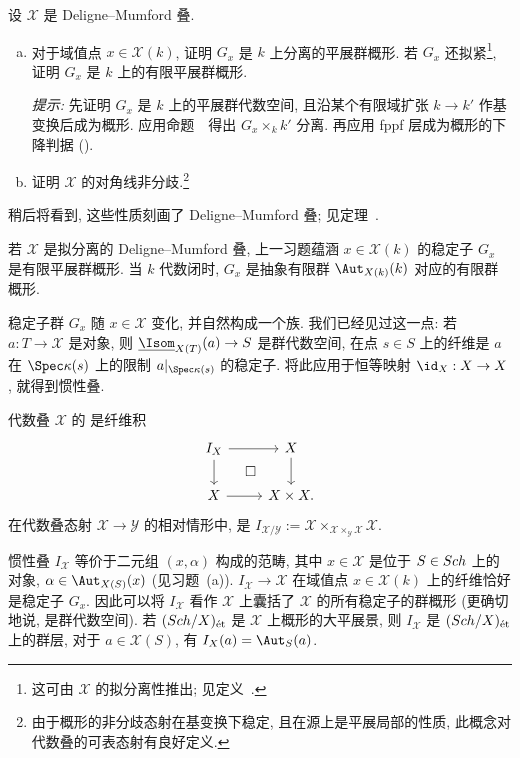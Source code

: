 \begin{exercise}\label{src:4.2.8}
设 $\mathcal X$ 是 Deligne--Mumford 叠.
\begin{enumerate}[(a)]
\item 对于域值点 $x\in\mathcal X(k)$, 证明 $G_x$ 是 $k$ 上分离的平展群概形. 若 $G_x$ 还拟紧\footnote{这可由 $\mathcal X$ 的拟分离性推出; 见定义~.}, 证明 $G_x$ 是 $k$ 上的有限平展群概形.

\emph{提示:} 先证明 $G_x$ 是 $k$ 上的平展群代数空间, 且沿某个有限域扩张 $k\to k'$ 作基变换后成为概形. 应用命题~~得出 $G_x\times_k k'$ 分离. 再应用 fppf 层成为概形的下降判据 ().
\item 证明 $\mathcal X$ 的对角线非分歧.\footnote{由于概形的非分歧态射在基变换下稳定, 且在源上是平展局部的性质, 此概念对代数叠的可表态射有良好定义.}
\end{enumerate}
稍后将看到, 这些性质刻画了 Deligne--Mumford 叠; 见定理~.
\end{exercise}
\begin{remark}\label{src:4.2.9}
若 $\mathcal X$ 是拟分离的 Deligne--Mumford 叠, 上一习题蕴涵 $x\in\mathcal X(k)$ 的稳定子 $G_x$ 是有限平展群概形. 当 $k$ 代数闭时, $G_x$ 是抽象有限群 $\Aut_{\mathcal X(k)}(k)$ 对应的有限群概形.
\end{remark}
稳定子群 $G_x$ 随 $x\in\mathcal X$ 变化, 并自然构成一个族. 我们已经见过这一点: 若 $a:T\to\mathcal X$ 是对象, 则 $\underline{\Isom}_{\mathcal X(T)}(a)\to S$ 是群代数空间, 在点 $s\in S$ 上的纤维是 $a$ 在 $\Spec\kappa(s)$ 上的限制 $a|_{\Spec\kappa(s)}$ 的稳定子. 将此应用于恒等映射 $\id_{\mathcal X}:\mathcal X\to\mathcal X$, 就得到惯性叠.
\begin{definition}[惯性叠]\label{src:4.2.10}
代数叠 $\mathcal X$ 的 是纤维积
\[
\begin{tikzcd}
I_{\mathcal X}\arrow[r]\arrow[d]\arrow[dr,phantom,"\square"]&\mathcal X\arrow[d]\\
\mathcal X\arrow[r]&\mathcal X\times\mathcal X.
\end{tikzcd}
\]
在代数叠态射 $\mathcal X\to\mathcal Y$ 的相对情形中,  是 $I_{\mathcal X/\mathcal Y}:=\mathcal X\times_{\mathcal X\times_{\mathcal Y}\mathcal X}\mathcal X$.
\end{definition}
惯性叠 $I_{\mathcal X}$ 等价于二元组 $(x,\alpha)$ 构成的范畴, 其中 $x\in\mathcal X$ 是位于 $S\in Sch$ 上的对象, $\alpha\in\Aut_{\mathcal X(S)}(x)$ (见习题~(a)). $I_{\mathcal X}\to\mathcal X$ 在域值点 $x\in\mathcal X(k)$ 上的纤维恰好是稳定子 $G_x$. 因此可以将 $I_{\mathcal X}$ 看作 $\mathcal X$ 上囊括了 $\mathcal X$ 的所有稳定子的群概形 (更确切地说, 是群代数空间). 若 $(Sch/X)_{\text{ét}}$ 是 $\mathcal X$ 上概形的大平展景, 则 $I_{\mathcal X}$ 是 $(Sch/X)_{\text{ét}}$ 上的群层, 对于 $a\in\mathcal X(S)$, 有 $I_{\mathcal X}(a)=\Aut_S(a)$.

